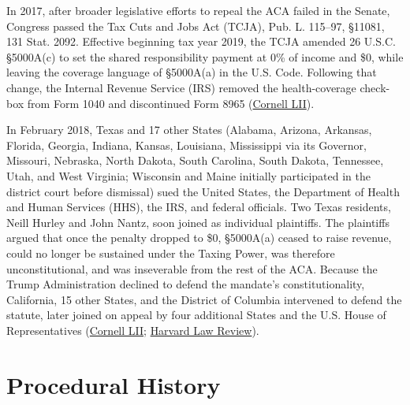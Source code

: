 \documentclass[12pt]{article}
\begin{document}
In 2017, after broader legislative efforts to repeal the ACA failed in the Senate, Congress passed the Tax Cuts and Jobs Act (TCJA), Pub. L. 115--97, \S 11081, 131 Stat. 2092. Effective beginning tax year 2019, the TCJA amended 26 U.S.C. \S 5000A(c) to set the shared responsibility payment at 0\% of income and \$0, while leaving the coverage language of \S 5000A(a) in the U.S. Code. Following that change, the Internal Revenue Service (IRS) removed the health-coverage check-box from Form 1040 and discontinued Form 8965 (\href{https://www.law.cornell.edu/supremecourt/text/19-840}{Cornell LII}).

In February 2018, Texas and 17 other States (Alabama, Arizona, Arkansas, Florida, Georgia, Indiana, Kansas, Louisiana, Mississippi via its Governor, Missouri, Nebraska, North Dakota, South Carolina, South Dakota, Tennessee, Utah, and West Virginia; Wisconsin and Maine initially participated in the district court before dismissal) sued the United States, the Department of Health and Human Services (HHS), the IRS, and federal officials. Two Texas residents, Neill Hurley and John Nantz, soon joined as individual plaintiffs. The plaintiffs argued that once the penalty dropped to \$0, \S 5000A(a) ceased to raise revenue, could no longer be sustained under the Taxing Power, was therefore unconstitutional, and was inseverable from the rest of the ACA. Because the Trump Administration declined to defend the mandate's constitutionality, California, 15 other States, and the District of Columbia intervened to defend the statute, later joined on appeal by four additional States and the U.S. House of Representatives (\href{https://www.law.cornell.edu/supremecourt/text/19-840}{Cornell LII}; \href{https://harvardlawreview.org/print/vol-135/california-v-texas/}{Harvard Law Review}).

\section{Procedural History}
\end{document}
